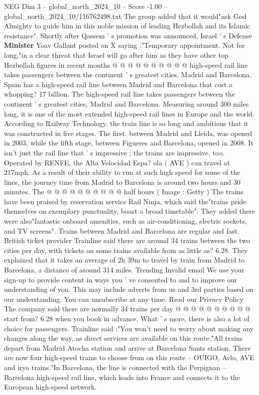 \begin{textsample}{NEG Dim 3 – global\_north\_2024\_10 – Score -1.00 – global\_north\_2024\_10/116762498.txt}
The group added that it would"ask God Almighty to guide him in this noble mission of leading Hezbollah and its Islamic resistance".
Shortly after Qassem ' s promotion was announced, Israel ' s Defense \textbf{Minister} Yoav Gallant posted on X saying :"Temporary appointment.
Not for long,"in a clear threat that Israel will go after him as they have other top Hezbollah figures in recent months @ @ @ @ @ @ @ @ @ @ high-speed rail line takes passengers between the continent ' s greatest cities, Madrid and Barcelona.
Spain has a high-speed rail line between Madrid and Barcelona that cost a whopping? 17 billion.
The high-speed rail line takes passengers between the continent ' s greatest cities, Madrid and Barcelona.
Measuring around 300 miles long, it is one of the most extended high-speed rail lines in Europe and the world.
According to Railway Technology, the train line is so long and ambitious that it was constructed in five stages.
The first, between Madrid and Lleida, was opened in 2003, while the fifth stage, between Figueres and Barcelona, opened in 2008.
It isn't just the rail line that ' s impressive ; the trains are impressive, too.
Operated by RENFE, the Alta Velocidad Espa? ola ( AVE ) can travel at 217mph.
As a result of their ability to run at such high speed for some of the lines, the journey time from Madrid to Barcelona is around two hours and 30 minutes.
The @ @ @ @ @ @ @ @ @ @ half hours ( Image : Getty ) The trains have been praised by reservation service Rail Ninja, which said the"trains pride themselves on exemplary punctuality, boast a broad timetable".
They added there were also"fantastic onboard amenities, such as air-conditioning, electric sockets, and TV screens".
Trains between Madrid and Barcelona are regular and fast.
British ticket provider Trainline said there are around 34 trains between the two cities per day, with tickets on some trains available from as little as? 6.28.
They explained that it takes an average of 2h 39m to travel by train from Madrid to Barcelona, a distance of around 314 miles.
Trending Invalid email We use your sign-up to provide content in ways you ' ve consented to and to improve our understanding of you.
This may include adverts from us and 3rd parties based on our understanding.
You can unsubscribe at any time.
Read our Privacy Policy The company said there are normally 34 trains per day @ @ @ @ @ @ @ @ @ @ start from? 6.28 when you book in advance.
What ' s more, there is also a lot of choice for passengers.
Trainline said :"You won't need to worry about making any changes along the way, as direct services are available on this route."All trains depart from Madrid Atocha station and arrive at Barcelona Sants station.
There are now four high-speed trains to choose from on this route -- OUIGO, Avlo, AVE and iryo trains."In Barcelona, the line is connected with the Perpignan -- Barcelona high-speed rail line, which leads into France and connects it to the European high-speed network.

\end{textsample}

